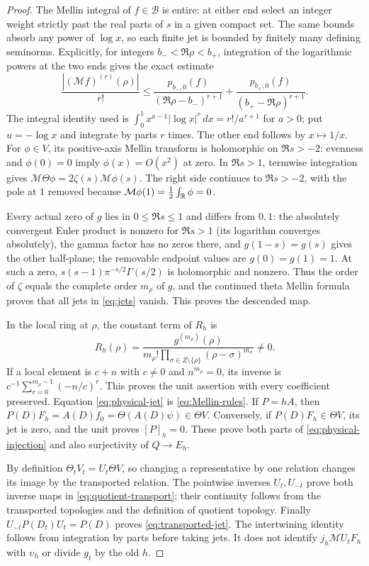 \documentclass[11pt]{article}
\newcommand{\B}{\mathscr B}\newcommand{\Epi}{\mathscr E_\pi}
\newcommand{\Mell}{\mathcal M}\newcommand{\Sch}{\mathcal S}
\begin{document}
\begin{proof}
The Mellin integral of $f\in\B$ is entire: at either end select
an integer weight strictly past the real parts of $s$ in a given
compact set. The same bounds absorb any power of $\log x$, so
each finite jet is bounded by finitely many defining seminorms.
Explicitly, for integers $b_-<\Re\rho<b_+$, integration of the
logarithmic powers at the two ends gives the exact estimate
\[
\frac{|(\Mell f)^{(r)}(\rho)|}{r!}
\leq\frac{p_{b_-,0}(f)}{(\Re\rho-b_-)^{r+1}}
+\frac{p_{b_+,0}(f)}{(b_+-\Re\rho)^{r+1}}.
\]
The integral identity used is
$\int_0^1x^{a-1}|\log x|^r\,dx=r!/a^{r+1}$ for $a>0$;
put $u=-\log x$ and integrate by parts $r$ times. The other
end follows by $x\mapsto1/x$.
For $\phi\in V$, its positive-axis Mellin transform is holomorphic
on $\Re s>-2$: evenness and $\phi(0)=0$ imply $\phi(x)=O(x^2)$
at zero. In $\Re s>1$, termwise integration gives
$\Mell\Theta\phi=2\zeta(s)\Mell\phi(s)$.
The right side continues to $\Re s>-2$, with the pole at $1$
removed because $\Mell\phi(1)=\tfrac12\int_\R\phi=0$.

Every actual zero of $g$ lies in $0\leq\Re s\leq1$ and differs
from $0,1$: the absolutely convergent Euler product is nonzero for
$\Re s>1$ (its logarithm converges absolutely), the gamma factor
has no zeros there, and $g(1-s)=g(s)$ gives the other half-plane;
the removable endpoint values are $g(0)=g(1)=1$.
At such a zero, $s(s-1)\pi^{-s/2}\Gamma(s/2)$ is holomorphic
and nonzero. Thus the order of $\zeta$ equals the complete order
$m_\rho$ of $g$, and the continued theta Mellin formula proves
that all jets in \eqref{eq:jets} vanish. This proves the descended map.

In the local ring at $\rho$, the constant term of $R_h$ is
\[
R_h(\rho)=\frac{g^{(m_\rho)}(\rho)}
{m_\rho!\prod_{\sigma\in Z\setminus\{\rho\}}
(\rho-\sigma)^{m_\sigma}}\ne0.
\]
If a local element is $c+n$ with $c\ne0$ and $n^{m_\rho}=0$,
its inverse is $c^{-1}\sum_{r=0}^{m_\rho-1}(-n/c)^r$.
This proves the unit assertion with every coefficient preserved.
Equation \eqref{eq:physical-jet} is \eqref{eq:Mellin-rules}.
If $P=hA$, then $P(D)F_h=A(D)f_0=\Theta(A(D)\psi)\in\Theta V$.
Conversely, if $P(D)F_h\in\Theta V$, its jet is zero, and the
unit proves $[P]_h=0$. These prove both parts of
\eqref{eq:physical-injection} and also surjectivity of $Q\to E_h$.

By definition $\Theta_tV_t=U_t\Theta V$, so changing a representative
by one relation changes its image by the transported relation.
The pointwise inverses $U_t,U_{-t}$ prove both inverse maps in
\eqref{eq:quotient-transport}; their continuity follows from the
transported topologies and the definition of quotient topology.
Finally $U_{-t}P(D_t)U_t=P(D)$ proves
\eqref{eq:transported-jet}. The intertwining identity follows from
integration by parts before taking jets. It does not identify
$j_h\Mell U_tF_h$ with $\upsilon_h$ or divide $g_t$ by the old $h$.
\end{proof}
\end{document}
